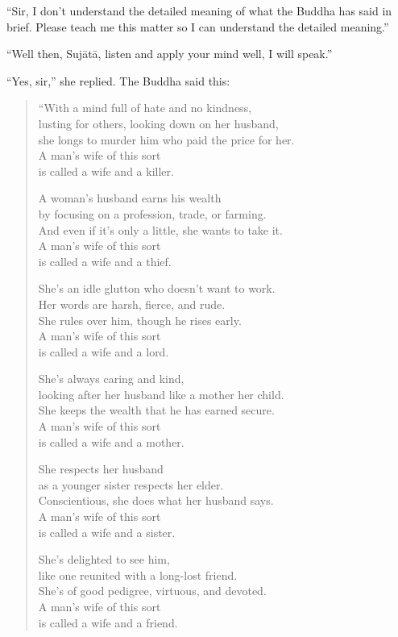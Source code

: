 \documentclass[12pt,openany]{book}%
\begin{document}
“Sir, I don’t understand the detailed meaning of what the Buddha has said in brief. Please teach me this matter so I can understand the detailed meaning.” 

“Well then, \textsanskrit{Sujātā}, listen and apply your mind well, I will speak.” 

“Yes, sir,” she replied. The Buddha said this: 

\begin{verse}%
“With a mind full of hate and no kindness, \\
lusting for others, looking down on her husband, \\
she longs to murder him who paid the price for her. \\
A man’s wife of this sort \\
is called a wife and a killer. 

A woman’s husband earns his wealth \\
by focusing on a profession, trade, or farming. \\
And even if it’s only a little, she wants to take it. \\
A man’s wife of this sort \\
is called a wife and a thief. 

She’s an idle glutton who doesn’t want to work. \\
Her words are harsh, fierce, and rude. \\
She rules over him, though he rises early. \\
A man’s wife of this sort \\
is called a wife and a lord. 

She’s always caring and kind, \\
looking after her husband like a mother her child. \\
She keeps the wealth that he has earned secure. \\
A man’s wife of this sort \\
is called a wife and a mother. 

She respects her husband \\
as a younger sister respects her elder. \\
Conscientious, she does what her husband says. \\
A man’s wife of this sort \\
is called a wife and a sister. 

She’s delighted to see him, \\
like one reunited with a long-lost friend. \\
She’s of good pedigree, virtuous, and devoted. \\
A man’s wife of this sort \\
is called a wife and a friend. 


\end{verse}
\end{document}
